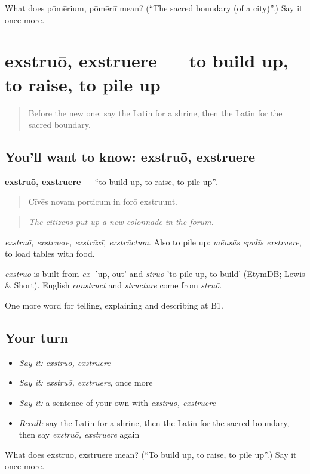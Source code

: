 \begin{tcolorbox}[breakable,colback=teal!4,colframe=teal!35!black,title={Before you move on}]
What does pōmērium, pōmēriī mean? (\textquotedblleft{}The sacred boundary (of a city)\textquotedblright{}.) Say it once more.
\end{tcolorbox}
\section[exstruō, exstruere]{exstruō, exstruere — to build up, to raise, to pile up}

\label{lesson:LA-C459-exstruo}



\begin{quote}
Before the new one: say the Latin for a shrine, then the Latin for the sacred boundary.
\end{quote}

\subsection*{You'll want to know: exstruō, exstruere}
\textbf{exstruō, exstruere} — \textquotedblleft{}to build up, to raise, to pile up\textquotedblright{}.

\begin{quote}
Cīvēs novam porticum in forō exstruunt.
\end{quote}

\begin{quote}
\emph{The citizens put up a new colonnade in the forum.}
\end{quote}

\emph{exstruō, exstruere, exstrūxī, exstrūctum}. Also to pile up: \emph{mēnsās epulīs exstruere}, to load tables with food.

\begin{cousinweb}
\emph{exstruō} is built from \emph{ex-} 'up, out' and \emph{struō} 'to pile up, to build' (EtymDB; Lewis \& Short). English \emph{construct} and \emph{structure} come from \emph{struō}.
\end{cousinweb}

\begin{grammarlens}[title={What you've built}]
One more word for telling, explaining and describing at B1.
\end{grammarlens}

\subsection*{Your turn}
\begin{itemize}
\raggedright
  \item \emph{Say it:} \emph{exstruō, exstruere}
  \item \emph{Say it:} \emph{exstruō, exstruere}, once more
  \item \emph{Say it:} a sentence of your own with \emph{exstruō, exstruere}
  \item \emph{Recall:} say the Latin for a shrine, then the Latin for the sacred boundary, then say \emph{exstruō, exstruere} again
\end{itemize}

\begin{tcolorbox}[breakable,colback=teal!4,colframe=teal!35!black,title={Before you move on}]
What does exstruō, exstruere mean? (\textquotedblleft{}To build up, to raise, to pile up\textquotedblright{}.) Say it once more.
\end{tcolorbox}
